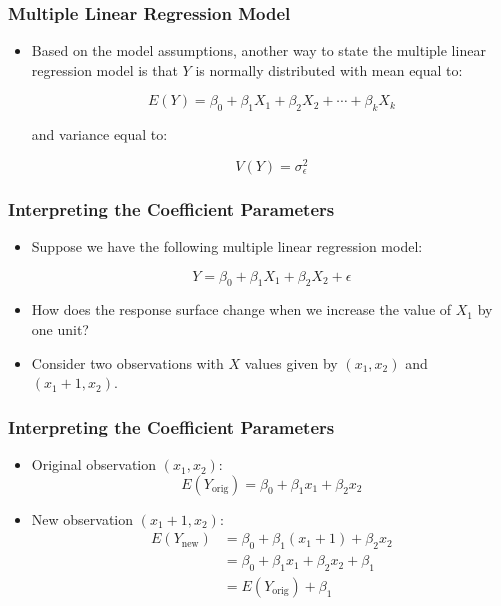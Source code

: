 \documentclass[14pt]{beamer}
\begin{document}
\begin{frame}
	\frametitle{Multiple Linear Regression Model}
	
	\begin{itemize}[label={\color{blue}$\blacktriangleright$}]
		\item Based on the model assumptions, another way to state the multiple linear regression model is that $Y$ is normally distributed with mean equal to:
		
	
		\[
		E(Y) = \beta_0 + \beta_1X_1 + \beta_2X_2 + \cdots + \beta_kX_k
		\]

		
		and variance equal to:
		
	
		\[
		V(Y) = \sigma_\epsilon^2
		\]
	\end{itemize}
	
\end{frame}
\begin{frame}
	\frametitle{Interpreting the Coefficient Parameters}
	
	\begin{itemize}[label={\color{blue}$\blacktriangleright$}]
		\item Suppose we have the following multiple linear regression model:
		

		\[
		Y = \beta_0 + \beta_1X_1 + \beta_2X_2 + \epsilon
		\]
				
		\item How does the response surface change when we increase the value of $X_1$ by one unit?
		
		\item Consider two observations with $X$ values given by $(x_1, x_2)$ and $(x_1 + 1, x_2)$.
		
	\end{itemize}
	
\end{frame}
\begin{frame}
	\frametitle{Interpreting the Coefficient Parameters}
	
	\begin{itemize}[label={\color{blue}$\blacktriangleright$}]
		\item Original observation $(x_1, x_2)$:
		\[
		E(Y_\text{orig}) = \beta_0 + \beta_1x_1 + \beta_2x_2
		\]
		
		\item New observation $(x_1 + 1, x_2)$:
		\[
		\begin{aligned}
			E(Y_\text{new}) &= \beta_0 + \beta_1(x_1 + 1) + \beta_2x_2 \\
			&= \beta_0 + \beta_1x_1 + \beta_2x_2 + \beta_1 \\
			&= E(Y_\text{orig}) + \beta_1
		\end{aligned}
		\]
		
	\end{itemize}
	
\end{frame}
\end{document}

